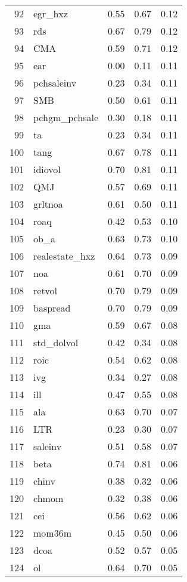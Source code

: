 \documentclass[12pt]{article}
\begin{document}
\begin{footnotesize}
\begin{longtable}{rl|c|c|c}
  92 & egr\_hxz & 0.55 & 0.67 & 0.12 \\ 
  93 & rds & 0.67 & 0.79 & 0.12 \\ 
  94 & CMA & 0.59 & 0.71 & 0.12 \\ 
  95 & ear & 0.00 & 0.11 & 0.11 \\ 
  96 & pchsaleinv & 0.23 & 0.34 & 0.11 \\ 
  97 & SMB & 0.50 & 0.61 & 0.11 \\ 
  98 & pchgm\_pchsale & 0.30 & 0.18 & 0.11 \\ 
  99 & ta & 0.23 & 0.34 & 0.11 \\ 
  100 & tang & 0.67 & 0.78 & 0.11 \\ 
  101 & idiovol & 0.70 & 0.81 & 0.11 \\ 
  102 & QMJ & 0.57 & 0.69 & 0.11 \\ 
  103 & grltnoa & 0.61 & 0.50 & 0.11 \\ 
  104 & roaq & 0.42 & 0.53 & 0.10 \\ 
  105 & ob\_a & 0.63 & 0.73 & 0.10 \\ 
  106 & realestate\_hxz & 0.64 & 0.73 & 0.09 \\ 
  107 & noa & 0.61 & 0.70 & 0.09 \\ 
  108 & retvol & 0.70 & 0.79 & 0.09 \\ 
  109 & baspread & 0.70 & 0.79 & 0.09 \\ 
  110 & gma & 0.59 & 0.67 & 0.08 \\ 
  111 & std\_dolvol & 0.42 & 0.34 & 0.08 \\ 
  112 & roic & 0.54 & 0.62 & 0.08 \\ 
  113 & ivg & 0.34 & 0.27 & 0.08 \\ 
  114 & ill & 0.47 & 0.55 & 0.08 \\ 
  115 & ala & 0.63 & 0.70 & 0.07 \\ 
  116 & LTR & 0.23 & 0.30 & 0.07 \\ 
  117 & saleinv & 0.51 & 0.58 & 0.07 \\ 
  118 & beta & 0.74 & 0.81 & 0.06 \\ 
  119 & chinv & 0.38 & 0.32 & 0.06 \\ 
  120 & chmom & 0.32 & 0.38 & 0.06 \\ 
  121 & cei & 0.56 & 0.62 & 0.06 \\ 
  122 & mom36m & 0.45 & 0.50 & 0.06 \\ 
  123 & dcoa & 0.52 & 0.57 & 0.05 \\ 
  124 & ol & 0.64 & 0.70 & 0.05 \\ 

\end{longtable}
\end{footnotesize}
\end{document}

